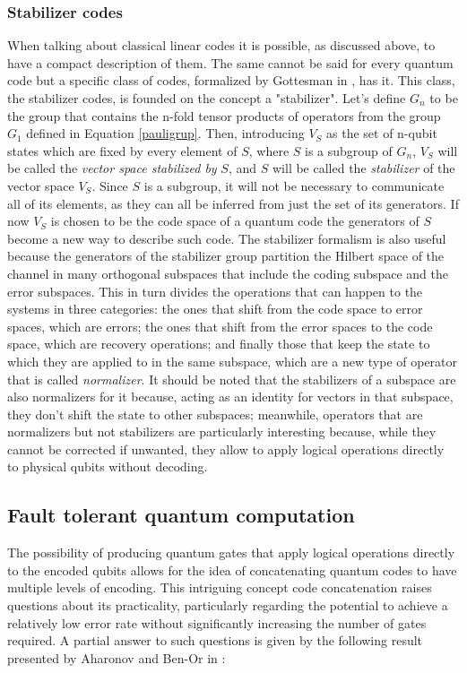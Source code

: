 \documentclass{article}
\begin{document}
\subsubsection{Stabilizer codes}
When talking about classical linear codes it is possible, as discussed above,
to have a compact description of them.
The same cannot be said for every quantum code but a specific class of
codes, formalized by Gottesman in \cite{gottesman1996class}, has it.
This class, the stabilizer codes, is founded on the concept a "stabilizer".
Let's define $G_n$ to be the group that contains the n-fold tensor
products of operators from the group $G_1$ defined in Equation \ref{pauligrup}.
Then, introducing $V_S$ as the set of n-qubit states which are fixed by every element of $S$,
where $S$ is a subgroup of $G_n$, $V_S$ will be called the \textit{vector space stabilized by} $S$,
and $S$ will be called the \textit{stabilizer} of the vector space $V_S$.
Since $S$ is a subgroup, it will not be necessary to communicate all of its elements,
as they can all be inferred from just the set of its generators.
If now $V_S$ is chosen to be the code space of a quantum code the generators of
$S$ become a new way to describe such code.
The stabilizer formalism is also useful because the generators of the stabilizer group
partition the Hilbert space of the channel in many orthogonal subspaces that include the
coding subspace and the error subspaces.
This in turn divides the operations that can happen to the systems in three categories:
the ones that shift from the code space to error spaces, which are errors;
the ones that shift from the error spaces to the code space, which are recovery operations;
and finally those that keep the state to which they are applied to in the same subspace,
which are a new type of operator that is called \textit{normalizer}.
It should be noted that the stabilizers of a subspace are also normalizers for it
because, acting as an identity for vectors in that subspace, they don't shift the state
to other subspaces;
meanwhile, operators that are normalizers but not stabilizers are particularly interesting
because, while they cannot be corrected if unwanted, they allow to apply logical operations
directly to physical qubits without decoding.

\subsection{Fault tolerant quantum computation}

The possibility of producing quantum gates that apply logical operations directly
to the encoded qubits allows for the idea of concatenating quantum codes to have multiple
levels of encoding.
This intriguing concept code concatenation raises questions about its practicality, particularly regarding the
potential to achieve a relatively low error rate without significantly increasing the number
of gates required.
A partial answer to such questions is given by the following result presented by Aharonov and
Ben-Or in \cite{aharonov1997fault}:
\end{document}
